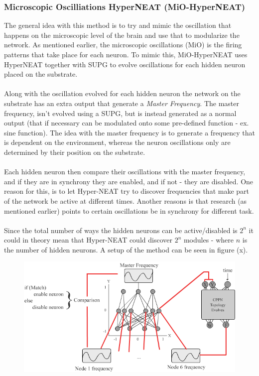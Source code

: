\documentclass[11pt, a4paper]{article}
\begin{document}
\subsubsection{Microscopic Oscilliations HyperNEAT (MiO-HyperNEAT)}
The general idea with this method is to try and mimic the oscillation that happens on the microscopic level of the brain and use that to modularize the network. As mentioned earlier, the microscopic oscillations (MiO) is the firing patterns that take place for each neuron. To mimic this, MiO-HyperNEAT uses HyperNEAT together with SUPG to evolve oscillations for each hidden neuron placed on the substrate.
\\
\\
Along with the oscillation evolved for each hidden neuron the network on the substrate has an extra output that generate a \textit{Master Frequency}. The master frequency, isn't evolved using a SUPG, but is instead generated as a normal output (that if necessary can be modulated onto some pre-defined function - ex. sine function). The idea with the master frequency is to generate a frequency that is dependent on the environment, whereas the neuron oscillations only are determined by their position on the substrate.
\\
\\
Each hidden neuron then compare their oscillations with the master frequency, and if they are in synchrony they are enabled, and if not - they are disabled. One reason for this, is to let Hyper-NEAT try to discover frequencies that make part of the network be active at different times. Another reasons is that research (as mentioned earlier) points to certain oscillations be in synchrony for different task.
\\
\\
Since the total number of ways the hidden neurons can be active/disabled is $ 2^n $ it could in theory mean that Hyper-NEAT could discover $ 2^n $ modules - where $ n $ is the number of hidden neurons. A setup of the method can be seen in figure (x).
\begin{figure}[!ht]
\centering
\includegraphics[scale=0.5]{MiO-HyperNEAT}
\caption{}
\end{figure}
\\
\end{document}
